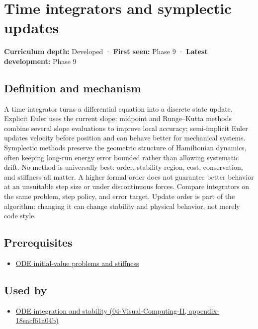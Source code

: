 \hypertarget{appendix-8f96f9c4d5bc}{}
\section{Time integrators and symplectic updates}\label{appendix-8f96f9c4d5bc-time-integrators-and-symplectic-updates}

\textbf{Curriculum depth:} Developed · \textbf{First seen:} Phase 9 · \textbf{Latest development:} Phase 9

\subsection{Definition and mechanism}\label{appendix-8f96f9c4d5bc-definition-and-mechanism}

A time integrator turns a differential equation into a discrete state update. Explicit Euler uses the current slope; midpoint and Runge--Kutta methods combine several slope evaluations to improve local accuracy; semi-implicit Euler updates velocity before position and can behave better for mechanical systems. Symplectic methods preserve the geometric structure of Hamiltonian dynamics, often keeping long-run energy error bounded rather than allowing systematic drift. No method is universally best: order, stability region, cost, conservation, and stiffness all matter. A higher formal order does not guarantee better behavior at an unsuitable step size or under discontinuous forces. Compare integrators on the same problem, step policy, and error target. Update order is part of the algorithm: changing it can change stability and physical behavior, not merely code style.

\subsection{Prerequisites}\label{appendix-8f96f9c4d5bc-prerequisites}

\begin{itemize}
\tightlist
\item
  \hyperref[appendix-e8ab9836882e]{ODE initial-value problems and stiffness}
\end{itemize}

\subsection{Used by}\label{appendix-8f96f9c4d5bc-used-by}

\begin{itemize}
\tightlist
\item
  \href{../04-Visual-Computing-II/main.pdf\#nameddest=appendix-18eacf61a04b}{ODE integration and stability (04-Visual-Computing-II, appendix-18eacf61a04b)}
\end{itemize}


